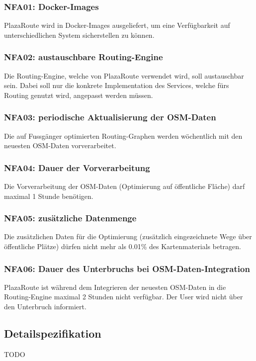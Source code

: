 \subsubsection{NFA01: Docker-Images}
\label{NFA:NFA01}

PlazaRoute wird in Docker-Images ausgeliefert, um eine Verfügbarkeit auf unterschiedlichen System sicherstellen zu können.

\subsubsection{NFA02: austauschbare Routing-Engine}
\label{NFA:NFA02}

Die Routing-Engine, welche von PlazaRoute verwendet wird, soll austauschbar sein. Dabei soll nur die konkrete Implementation des Services, welche fürs Routing genutzt wird, angepasst werden müssen.

\subsubsection{NFA03: periodische Aktualisierung der OSM-Daten}
\label{NFA:NFA03}

Die auf Fussgänger optimierten Routing-Graphen werden wöchentlich mit den neuesten \ac{OSM}-Daten vorverarbeitet.

\subsubsection{NFA04: Dauer der Vorverarbeitung}
\label{NFA:NFA04}

Die Vorverarbeitung der \ac{OSM}-Daten (Optimierung auf öffentliche Fläche) darf maximal 1 Stunde benötigen.

\subsubsection{NFA05: zusätzliche Datenmenge}
\label{NFA:NFA05}

Die zusätzlichen Daten für die Optimierung (zusätzlich eingezeichnete Wege über öffentliche Plätze) dürfen nicht mehr als 0.01\% des Kartenmaterials betragen.

\subsubsection{NFA06: Dauer des Unterbruchs bei OSM-Daten-Integration}
\label{NFA:NFA06}

PlazaRoute ist während dem Integrieren der neuesten \ac{OSM}-Daten in die Routing-Engine maximal 2 Stunden nicht verfügbar. Der User wird nicht über den Unterbruch informiert.

\subsection{Detailspezifikation}
\label{sub:Detailspezifikation}

TODO